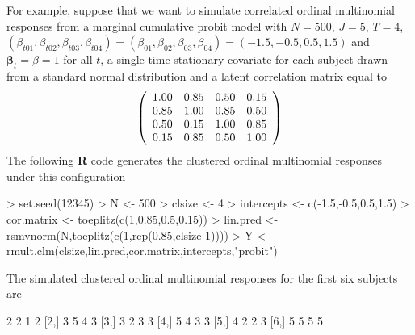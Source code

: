 \documentclass{article}
\begin{document}
\indent For example, suppose that we want to simulate correlated ordinal multinomial responses from a marginal cumulative probit model with $N=500$, $J=5$, $T=4$, $(\beta_{t01},\beta_{t02},\beta_{t03},\beta_{t04})=(\beta_{01},\beta_{02},\beta_{03},\beta_{04})=(-1.5,-0.5,0.5,1.5)$ and $\boldsymbol \beta_t=\beta=1$ for all $t$, a single time-stationary covariate for each subject drawn from a standard normal distribution and a latent correlation matrix equal to
$$\left( {\begin{array}{*{20}c}
   1.00 & 0.85 & 0.50 & 0.15  \\
   0.85 & 1.00 & 0.85 & 0.50  \\
   0.50 & 0.15 & 1.00 & 0.85 \\
   0.15 & 0.85 & 0.50 & 1.00
 \end{array} } \right)$$
The following \textbf{R} code generates the clustered ordinal multinomial responses under this configuration
\begin{Schunk}
\begin{Sinput}
> set.seed(12345)
> N <- 500
> clsize <- 4
> intercepts <- c(-1.5,-0.5,0.5,1.5)
> cor.matrix <- toeplitz(c(1,0.85,0.5,0.15))
> lin.pred <- rsmvnorm(N,toeplitz(c(1,rep(0.85,clsize-1))))
> Y <- rmult.clm(clsize,lin.pred,cor.matrix,intercepts,"probit")
\end{Sinput}
\end{Schunk}
The simulated clustered ordinal multinomial responses for the first six subjects are 
\begin{Schunk}
\begin{Soutput}
     [,1] [,2] [,3] [,4]
[1,]    2    2    1    2
[2,]    3    5    4    3
[3,]    3    2    3    3
[4,]    5    4    3    3
[5,]    4    2    2    3
[6,]    5    5    5    5
\end{Soutput}
\end{Schunk}
\end{document}
